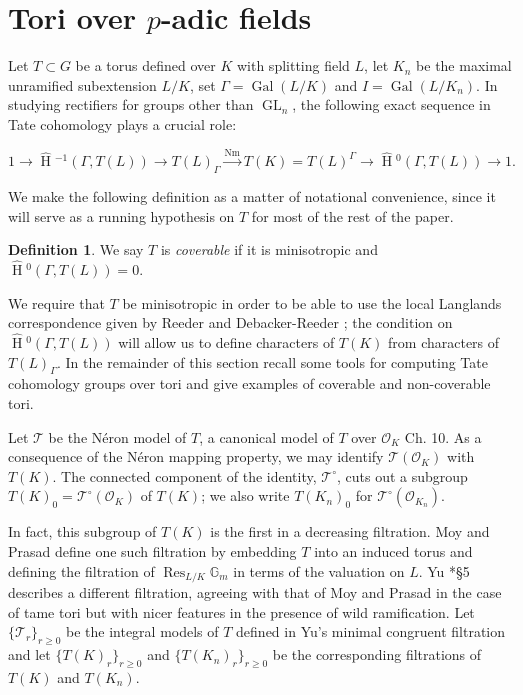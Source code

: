 \documentclass{amsart}
\theoremstyle{plain}
\newcommand{\HT}[1]{\hat{\HH}{}^{#1}}
\theoremstyle{definition}
\newtheorem{definition}[theorem]{Definition}
\numberwithin{equation}{section}
\DeclareMathOperator{\Gal}{Gal}
\DeclareMathOperator{\HH}{H}
\DeclareMathOperator{\Nm}{Nm}
\DeclareMathOperator{\Res}{Res}
\DeclareMathOperator{\GL}{GL}
\newcommand{\TT}{\mathcal{T}}
\newcommand{\OK}{\mathcal{O}_K}
\newcommand{\OKn}{\mathcal{O}_{K_n}}
\newcommand{\Gm}{\mathbb{G}_m}
\begin{document}
\section{Tori over $p$-adic fields} \label{section:padic_tori}

Let $T \subset G$ be a torus defined over $K$ with splitting field $L$, let $K_n$ be the maximal
unramified subextension $L/K$, set $\Gamma = \Gal(L/K)$ and $I = \Gal(L/K_n)$.
In studying rectifiers for groups other than $\GL_n$, the following exact sequence
in Tate cohomology plays a crucial role:

\begin{equation} \label{eq:tate4}
1 \rightarrow \HT{-1}(\Gamma,T(L)) \rightarrow T(L)_{\Gamma} \xrightarrow{\Nm} T(K)
  = T(L)^{\Gamma} \rightarrow \HT{0}(\Gamma,T(L)) \rightarrow 1.
\end{equation}

\noindent We make the following definition as a matter of notational convenience, since
it will serve as a running hypothesis on $T$ for most of the rest of the paper.

\begin{definition} \label{def:coverable}
We say $T$ is \emph{coverable} if it is minisotropic and $\HT{0}(\Gamma, T(L)) = 0$.
\end{definition}

We require that $T$ be minisotropic in order to be able to use the local Langlands correspondence
given by Reeder \cite{reeder:08a} and Debacker-Reeder \cite{reeder-debacker:09a}; the condition
on $\HT{0}(\Gamma, T(L))$ will allow us to define characters of $T(K)$ from characters of
$T(L)_\Gamma$.  In the remainder of this section recall some tools for computing Tate cohomology
groups over tori and give examples of coverable and non-coverable tori.

Let $\TT$ be the N\'eron model of $T$, a canonical model of $T$
over $\OK$ \cite{bosch-lutkebohmert-reynaud:NeronModels}{Ch. 10}.
As a consequence of the N\'eron mapping
property, we may identify $\TT(\OK)$ with $T(K)$.  The connected
component of the identity, $\TT^\circ$, cuts out a subgroup
$T(K)_0 = \TT^\circ(\OK)$ of $T(K)$; we also write $T(K_n)_0$ for
$\TT^\circ(\OKn)$.

In fact, this subgroup of $T(K)$ is the first in a decreasing filtration.
Moy and Prasad \cite{moy-prasad:96a}
define one such filtration by
embedding $T$ into an induced torus and defining the filtration of
$\Res_{L/K} \Gm$ in terms of the valuation on $L$.  Yu \cite{yu:03a}*{\S 5}
describes a different filtration, agreeing with that of Moy and Prasad
in the case of tame tori but with nicer features in the presence of wild
ramification.  Let $\{\TT_r\}_{r \ge 0}$ be the integral models of $T$ defined in Yu's
minimal congruent filtration and let $\{T(K)_r\}_{r \ge 0}$ and
$\{T(K_n)_r\}_{r \ge 0}$ be the corresponding filtrations of $T(K)$ and
$T(K_n)$.
\end{document}
